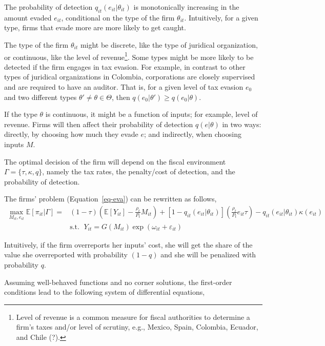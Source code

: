 \documentclass[
  12pt]{article}
\begin{document}
The probability of detection \(q_{it}(e_{it}|\theta_{it})\) is
monotonically increasing in the amount evaded \(e_{it}\), conditional on
the type of the firm \(\theta_{it}\). Intuitively, for a given type,
firms that evade more are more likely to get caught.

The type of the firm \(\theta_{it}\) might be discrete, like the type of
juridical organization, or continuous, like the level of
revenue\footnote{Level of revenue is a common measure for fiscal
  authorities to determine a firm's taxes and/or level of scrutiny,
  e.g., Mexico, Spain, Colombia, Ecuador, and Chile (?).}. Some types
might be more likely to be detected if the firm engages in tax evasion.
For example, in contrast to other types of juridical organizations in
Colombia, corporations are closely supervised and are required to have
an auditor. That is, for a given level of tax evasion \(e_0\) and two
different types \(\theta' \not= \theta \in \mathbfcal{\Theta}\), then
\(q(e_0|\theta')\ge q(e_0|\theta)\).

If the type \(\theta\) is continuous, it might be a function of inputs;
for example, level of revenue. Firms will then affect their probability
of detection \(q(e|\theta)\) in two ways: directly, by choosing how much
they evade \(e\); and indirectly, when choosing inputs \(M\).

The optimal decision of the firm will depend on the fiscal environment
\(\Gamma=\{\tau, \kappa, q \}\), namely the tax rates, the penalty/cost
of detection, and the probability of detection.

The firms' problem (Equation~\ref{eq-eva}) can be rewritten as follows,
\[
\begin{aligned}
  \max_{M_{it},e_{it}} \mathbb{E}[\pi_{it}|\Gamma] = &(1-\tau)\left(\mathbb{E}[Y_{it}]-\frac{\rho_{t}}{P_t} M_{it}\right)+[1-q_{it}(e_{it}|\theta_{it})]\left(\frac{\rho_{t}}{P_t}e_{it}\tau\right)
  -q_{it}(e_{it}|\theta_{it})\kappa(e_{it}) \\
  &\text{s.t. }\; Y_{it}=G(M_{it})\exp(\omega_{it}+\varepsilon_{it})
\end{aligned}
\]

Intuitively, if the firm overreports her inputs' cost, she will get the
share of the value she overreported with probability \((1-q)\) and she
will be penalized with probability \(q\).

Assuming well-behaved functions and no corner solutions, the first-order
conditions lead to the following system of differential equations,
\end{document}
